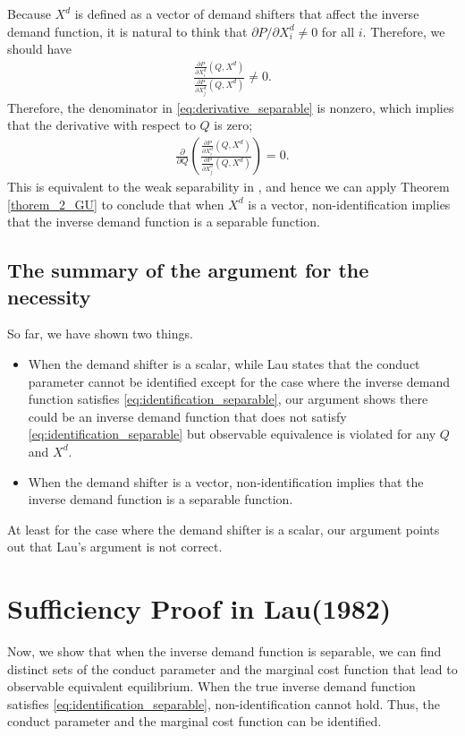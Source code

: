 \documentclass[11pt, a4paper]{article}
\theoremstyle{remark}
\begin{document}
Because $X^{d}$ is defined as a vector of demand shifters that affect the inverse demand function, it is natural to think that $\partial P/\partial X^{d}_{i} \ne 0$ for all $i$.
Therefore, we should have
\begin{align}
    \frac{\frac{\partial P}{\partial X^{d}_{i}}(Q, X^{d})}{\frac{\partial P}{\partial X^{d}_{j}}(Q, X^{d})} \ne 0.
\end{align}
Therefore, the denominator in \eqref{eq:derivative_separable} is nonzero, which implies that the derivative with respect to $Q$ is zero;
\begin{align}
    \frac{\partial}{\partial Q} \left(\frac{\frac{\partial P}{\partial X^{d}_{i}}(Q, X^{d})}{\frac{\partial P}{\partial X^{d}_{j}}(Q, X^{d})}\right) = 0.
\end{align}
This is equivalent to the weak separability in \citet{goldmanNote1964}, and hence we can apply Theorem \ref{thorem_2_GU} to conclude that when $X^{d}$ is a vector, non-identification implies that the inverse demand function is a separable function.



\subsection{The summary of the argument for the necessity}
So far, we have shown two things.
\begin{itemize}
    \item When the demand shifter is a scalar, while Lau states that the conduct parameter cannot be identified except for the case where the inverse demand function satisfies \eqref{eq:identification_separable}, our argument shows there could be an inverse demand function that does not satisfy \eqref{eq:identification_separable} but observable equivalence is violated for any $Q$ and $X^{d}$.
    \item When the demand shifter is a vector, non-identification implies that the inverse demand function is a separable function.
\end{itemize}
At least for the case where the demand shifter is a scalar, our argument points out that Lau's argument is not correct.



\section{Sufficiency Proof in Lau(1982)}\label{sec:proof_lau_sufficiency}
Now, we show that when the inverse demand function is separable, we can find distinct sets of the conduct parameter and the marginal cost function that lead to observable equivalent equilibrium.
When the true inverse demand function satisfies \eqref{eq:identification_separable}, non-identification cannot hold.
Thus, the conduct parameter and the marginal cost function can be identified.
\end{document}
